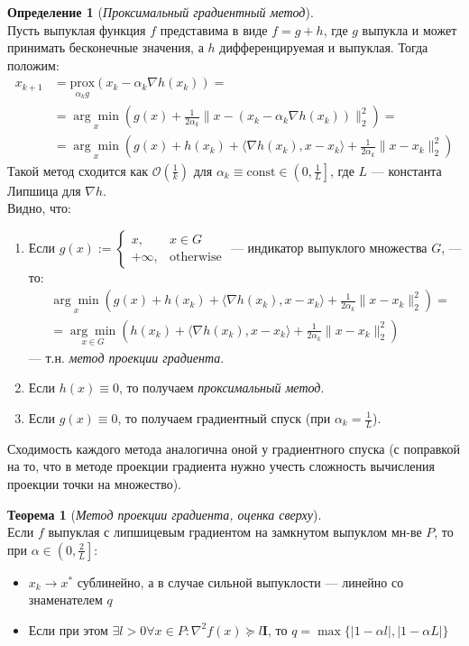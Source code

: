 \documentclass[11pt,a4paper]{report}
\theoremstyle{definition}
\theoremstyle{definition}
\newtheorem{theorem}{Теорема}[section]
\theoremstyle{definition}
\newtheorem*{definition}{Определение}
\begin{document}
	\begin{definition}[\textit{Проксимальный градиентный метод}]$  $\\
		Пусть выпуклая функция $ f $ представима в виде $ f = g + h $, где $ g $ выпукла и может принимать бесконечные значения, а $ h $ дифференцируемая и выпуклая. Тогда положим:
		\begin{align*}
			x_{k+1} &= \underset{\alpha_k g}{\mathrm{prox}} (x_k - \alpha_k \nabla h(x_k)) =\\
							&= \underset{x}{\arg\min} \left (g(x) + \frac{1}{2\alpha_k} \| x - (x_k - \alpha_k \nabla h(x_k)) \|_2^2 \right ) =\\
							&=  \underset{x}{\arg\min} \left (g(x) + h(x_k) + \langle \nabla h(x_k), x - x_k \rangle + \frac{1}{2\alpha_k} \| x - x_k \|_2^2 \right )
		\end{align*}
		Такой метод сходится как $ \mathcal{O}\left ( \frac{1}{k} \right ) $ для $ \alpha_k \equiv \mathrm{const} \in \left (0, \frac{1}{L}\right ] $, где $ L $ — константа Липшица для $ \nabla h $.\\
		Видно, что:
		\begin{enumerate}
			\item Если $ g(x) := \begin{cases}
				x,& x \in G\\
				+\infty, &\text{otherwise}
			\end{cases} $ — индикатор выпуклого множества $ G $, — то:
			\begin{align*}
				&\underset{x}{\arg\min} \left (g(x) + h(x_k) + \langle \nabla h(x_k), x - x_k \rangle + \frac{1}{2\alpha_k} \| x - x_k \|_2^2 \right ) =\\
				&= \underset{x \in G}{\arg\min} \left ( h(x_k) + \langle \nabla h(x_k), x - x_k \rangle + \frac{1}{2\alpha_k} \| x - x_k \|_2^2 \right )
			\end{align*}
			— т.н. \textit{метод проекции градиента}.
			\item Если $ h(x) \equiv 0 $, то получаем \textit{проксимальный метод}.
			\item Если $ g(x) \equiv 0 $, то получаем градиентный спуск (при $ \alpha_k = \frac{1}{L} $).
		\end{enumerate}
		Сходимость каждого метода аналогична оной у градиентного спуска (с поправкой на то, что в методе проекции градиента нужно учесть сложность вычисления проекции точки на множество). 
	\end{definition}
	\begin{theorem}[\textit{Метод проекции градиента, оценка сверху}]$  $\\
		Если $ f $ выпуклая с липшицевым градиентом на замкнутом выпуклом мн-ве $ P $, то при $ \alpha \in \left (0, \frac{2}{L} \right ] $:		
		\begin{itemize}[$\diamond$]
			\item $ x_k \to x^{*} $ сублинейно, а в случае сильной выпуклости — линейно со знаменателем $ q $
			\item Если при этом $ \exists l > 0 \forall x \in P: \nabla^2 f(x) \succeq l \textbf{I} $, то $ q = \max \{ |1 - \alpha l|, |1 - \alpha L| \} $
		\end{itemize}
	\end{theorem}
\end{document}
